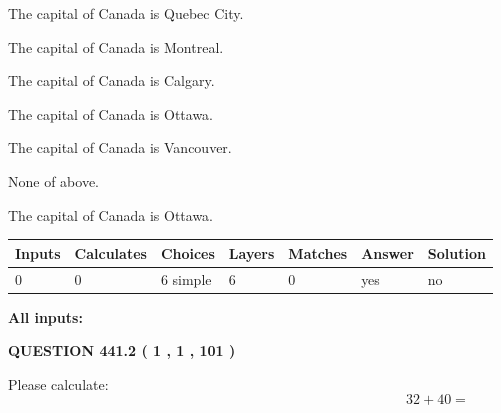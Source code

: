 \documentclass[12pt]{article}
\begin{document}
 
The capital of Canada is Quebec City.
 
 
The capital of Canada is Montreal.
 
 
The capital of Canada is Calgary.
 
 
The capital of Canada is Ottawa.
 
 
The capital of Canada is Vancouver.
 
 
 None of above.
 
 
\noindent{}
 
 
The capital of Canada is Ottawa.
 
 
\noindent{}
 
 
   
   
   
   
\noindent\begin{tabular}{|l|l|l|l|l|l|l|}
 \hline
Inputs & Calculates & Choices & Layers & Matches & Answer & Solution \\ \hline
 0  & 
 0  & 
 6
  simple  
  & 
 6  & 
 0  & 
  yes & 
  no 
  \\ \hline
 \end{tabular}
   
   
   
   
\noindent{}
   
   
   
   
\noindent\vspace{0.1in}\hspace{-0.08in} {\textbf{\Large{All inputs: }}}
   
   
  
\vspace{0.2in}
  
{\textbf{\Large{QUESTION
441.2 
 ( 1 , 1 , 101 )
}}}
  
  
 
Please calculate:
\begin{equation}
32 +  %
40 = \nonumber
\end{equation}
 
 
 
\noindent{}
 
\end{document}
